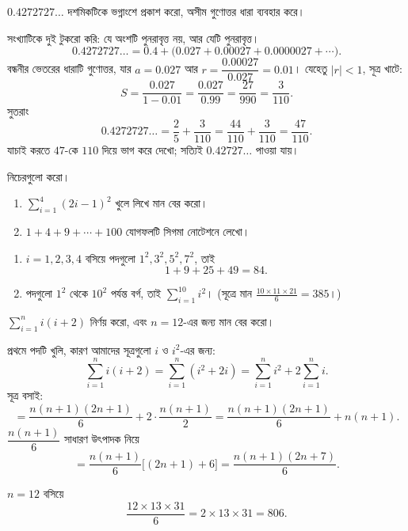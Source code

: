 \documentclass[11pt]{article}
\begin{document}
 $0.4272727\ldots$ দশমিকটিকে ভগ্নাংশে প্রকাশ করো, অসীম গুণোত্তর ধারা
ব্যবহার করে।

\begin{sol}
সংখ্যাটিকে দুই টুকরো করি: যে অংশটি পুনরাবৃত্ত নয়, আর যেটি পুনরাবৃত্ত।
\[
  0.4272727\ldots = 0.4 + \big( 0.027 + 0.00027 + 0.0000027 + \cdots \big) .
\]
বন্ধনীর ভেতরের ধারাটি গুণোত্তর, যার $a = 0.027$ আর
$r = \dfrac{0.00027}{0.027} = 0.01$। যেহেতু $|r| < 1$, সূত্র খাটে:
\[
  S = \frac{0.027}{1 - 0.01} = \frac{0.027}{0.99} = \frac{27}{990}
    = \frac{3}{110} .
\]
সুতরাং
\[
  0.4272727\ldots = \frac{2}{5} + \frac{3}{110}
  = \frac{44}{110} + \frac{3}{110} = \frac{47}{110} .
\]
যাচাই করতে $47$-কে $110$ দিয়ে ভাগ করে দেখো; সত্যিই $0.42727\ldots$ পাওয়া যায়।
\end{sol}

 নিচেরগুলো করো।
\begin{enumerate}
  \item $\displaystyle \sum_{i=1}^{4} (2i - 1)^{2}$ খুলে লিখে মান বের করো।
  \item $1 + 4 + 9 + \cdots + 100$ যোগফলটি সিগমা নোটেশনে লেখো।
\end{enumerate}

\begin{sol}
\begin{enumerate}
  \item $i = 1, 2, 3, 4$ বসিয়ে পদগুলো $1^{2}, 3^{2}, 5^{2}, 7^{2}$, তাই
        \[
          1 + 9 + 25 + 49 = 84 .
        \]
  \item পদগুলো $1^{2}$ থেকে $10^{2}$ পর্যন্ত বর্গ, তাই
        $\displaystyle \sum_{i=1}^{10} i^{2}$। (সূত্রে মান
        $\tfrac{10 \times 11 \times 21}{6} = 385$।)
\end{enumerate}
\end{sol}

 $\displaystyle \sum_{i=1}^{n} i(i+2)$ নির্ণয় করো, এবং $n = 12$-এর
জন্য মান বের করো।

\begin{sol}
প্রথমে পদটি খুলি, কারণ আমাদের সূত্রগুলো $i$ ও $i^{2}$-এর জন্য:
\[
  \sum_{i=1}^{n} i(i+2) = \sum_{i=1}^{n} (i^{2} + 2i)
  = \sum_{i=1}^{n} i^{2} + 2 \sum_{i=1}^{n} i .
\]
সূত্র বসাই:
\[
  = \frac{n(n+1)(2n+1)}{6} + 2 \cdot \frac{n(n+1)}{2}
  = \frac{n(n+1)(2n+1)}{6} + n(n+1) .
\]
$\dfrac{n(n+1)}{6}$ সাধারণ উৎপাদক নিয়ে
\[
  = \frac{n(n+1)}{6}\Big[ (2n+1) + 6 \Big] = \frac{n(n+1)(2n+7)}{6} .
\]

$n = 12$ বসিয়ে
\[
  \frac{12 \times 13 \times 31}{6} = 2 \times 13 \times 31 = 806 .
\]
\end{sol}
\end{document}
